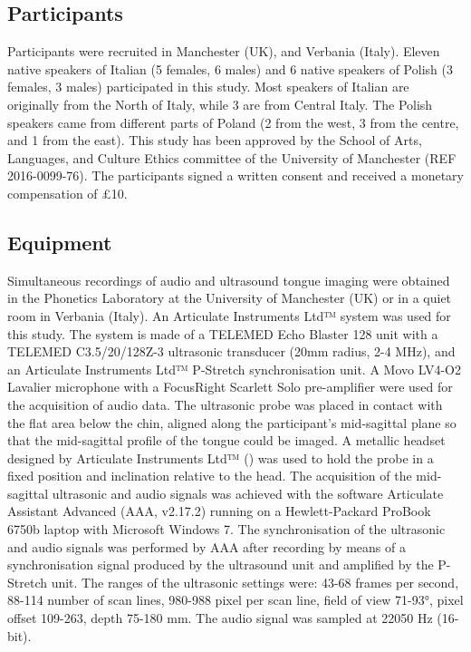 \documentclass[preprint]{JASAnew}
\begin{document}
\hypertarget{participants}{%
\subsection{Participants}\label{participants}}

Participants were recruited in Manchester (UK), and Verbania (Italy).
Eleven native speakers of Italian (5 females, 6 males) and 6 native
speakers of Polish (3 females, 3 males) participated in this study. Most
speakers of Italian are originally from the North of Italy, while 3 are
from Central Italy. The Polish speakers came from different parts of
Poland (2 from the west, 3 from the centre, and 1 from the east). This
study has been approved by the School of Arts, Languages, and Culture
Ethics committee of the University of Manchester (REF 2016-0099-76). The
participants signed a written consent and received a monetary
compensation of £10.

\hypertarget{equipment}{%
\subsection{Equipment}\label{equipment}}

\label{s:equipment}

Simultaneous recordings of audio and ultrasound tongue imaging were
obtained in the Phonetics Laboratory at the University of Manchester
(UK) or in a quiet room in Verbania (Italy). An Articulate Instruments
Ltd™ system was used for this study. The system is made of a TELEMED
Echo Blaster 128 unit with a TELEMED C3.5/20/128Z-3 ultrasonic
transducer (20mm radius, 2-4 MHz), and an Articulate Instruments Ltd™
P-Stretch synchronisation unit. A Movo LV4-O2 Lavalier microphone with a
FocusRight Scarlett Solo pre-amplifier were used for the acquisition of
audio data. The ultrasonic probe was placed in contact with the flat
area below the chin, aligned along the participant's mid-sagittal plane
so that the mid-sagittal profile of the tongue could be imaged. A
metallic headset designed by Articulate Instruments Ltd™
(\citeyear{articulate2008}) was used to hold the probe in a fixed
position and inclination relative to the head. The acquisition of the
mid-sagittal ultrasonic and audio signals was achieved with the software
Articulate Assistant Advanced (AAA, v2.17.2) running on a
Hewlett-Packard ProBook 6750b laptop with Microsoft Windows 7. The
synchronisation of the ultrasonic and audio signals was performed by AAA
after recording by means of a synchronisation signal produced by the
ultrasound unit and amplified by the P-Stretch unit. The ranges of the
ultrasonic settings were: 43-68 frames per second, 88-114 number of scan
lines, 980-988 pixel per scan line, field of view 71-93°, pixel offset
109-263, depth 75-180 mm. The audio signal was sampled at 22050 Hz
(16-bit).
\end{document}
